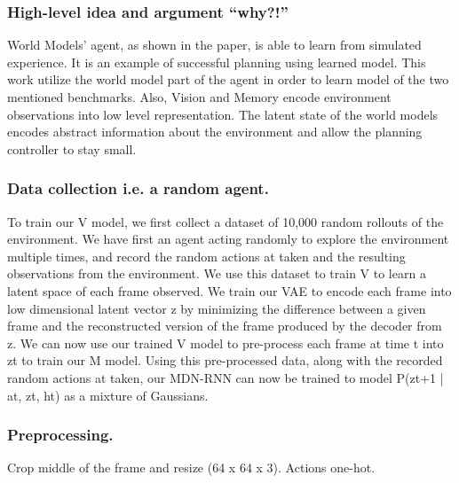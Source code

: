 \subsubsection{High-level idea and argument ``why?!''}
World Models' agent, as shown in the paper\cite{Algo.WorldModels}, is able to learn from simulated experience. It is an example of successful planning using learned model. This work utilize the world model part of the agent in order to learn model of the two mentioned benchmarks. Also, Vision and Memory encode environment observations into low level representation. The latent state of the world models encodes abstract information about the environment and allow the planning controller to stay small.

\subsubsection{Data collection i.e. a random agent.}
To train our V model, we first collect a dataset of 10,000 random rollouts of the environment. We have first an agent acting randomly to explore the environment multiple times, and record the random actions at taken and the resulting observations from the environment. We use this dataset to train V to learn a latent space of each frame observed. We train our VAE to encode each frame into low dimensional latent vector z by minimizing the difference between a given frame and the reconstructed version of the frame produced by the decoder from z.
We can now use our trained V model to pre-process each frame at time t into zt to train our M model. Using this pre-processed data, along with the recorded random actions at taken, our MDN-RNN can now be trained to model P(zt+1 | at, zt, ht) as a mixture of Gaussians.

\subsubsection{Preprocessing.}
Crop middle of the frame and resize (64 x 64 x 3).
Actions one-hot.

